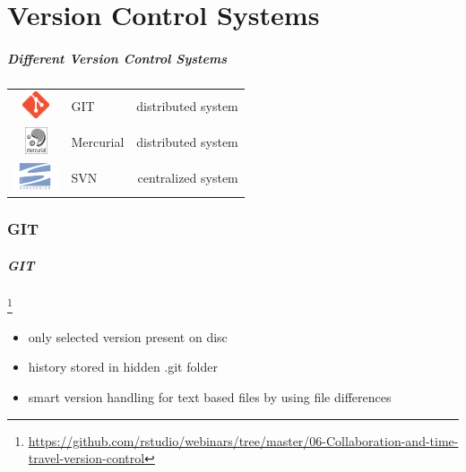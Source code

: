 \documentclass[
t, %
10pt, %
aspectratio=1610, %
ngerman,
english,
]{beamer}
\newcommand\blfootnote[1]{%
  \begingroup
  \renewcommand\thefootnote{}\footnote{#1}%
  \addtocounter{footnote}{-1}%
  \endgroup
}
\begin{document}
\part{Version Control Systems}
\makepart

\begin{frame}
    \frametitle{Different Version Control Systems}
    \centering
    \vfill
    \begin{tabular}{ c l r }
        \includegraphics[height=0.8cm]{graphics/giticon_orange.eps} & \large{GIT} &  distributed system\\
        \includegraphics[height=0.8cm]{graphics/Mercurial_logo.png} & \large{Mercurial} &  distributed system\\
        \includegraphics[height=0.8cm]{graphics/Subversion_Logo.png} & \large{SVN} &  centralized system\\
    \end{tabular}
    \vfill
\end{frame}

\section{GIT}
\begin{frame}
    \frametitle{GIT}
    \blfootnote{\url{https://github.com/rstudio/webinars/tree/master/06-Collaboration-and-time-travel-version-control}}
    \begin{minipage}{0.5\textwidth}
	\begin{itemize}
	    \item only selected version present on disc
	    \item history stored in hidden .git folder
	    \item smart version handling for text based files by using file differences
	\end{itemize}
    \end{minipage}
    \hfill
    \begin{minipage}{0.5\textwidth}
	
    \end{minipage}
\end{frame}
\end{document}
